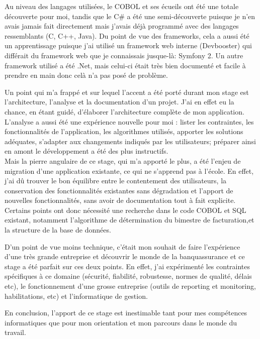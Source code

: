 \documentclass[a4paper,french,12pt]{article}
\begin{document}
		
		Au niveau des langages utilisées, le COBOL et ses écueils ont été une totale découverte pour moi, tandis que le C\# a été une semi-découverte puisque je n'en avais jamais fait directement mais 
		j'avais déjà programmé avec des langages ressemblants (C, C++, Java).
		Du point de vue des frameworks, cela a aussi été un apprentissage puisque j'ai utilisé un framework web interne (Devbooster) qui différait du framework web que je connaissais jusque-là: Symfony 2.
		Un autre framework utilisé a été .Net, mais celui-ci était très bien documenté et facile à prendre en main donc celà n'a pas posé de problème.
		
		Un point qui m'a frappé et sur lequel l'accent a été porté durant mon stage est l'architecture, l'analyse et la documentation d'un projet. J'ai en effet eu la chance, en étant guidé, d'élaborer
		l'architecture complète de mon application. L'analyse a aussi été une expérience nouvelle pour moi : lister les contraintes, les fonctionnalités de l'application, les algorithmes utilisés, apporter les solutions adéquates,
		s'adapter aux changements indiqués par les utilisateurs; préparer ainsi en amont le développement a été des plus instructifs.\\
		
		
		Mais la pierre angulaire de ce stage, qui m'a apporté le plus, a été l'enjeu de migration d'une application existante, ce qui ne s'apprend pas à l'école. En effet, j'ai dû trouver le bon équilibre
		entre le contentement des utilisateurs, la conservation des fonctionnalités existantes sans dégradation et l'apport de nouvelles fonctionnalités, sans avoir de documentation tout à fait explicite.
		Certains points ont donc nécessité une recherche dans le code COBOL et SQL existant, notamment l'algorithme de détermination du bimestre de facturation,et la structure de la base de données.
		
		
		D'un point de vue moins technique, c'était mon souhait de faire l'expérience d'une très grande entreprise et découvrir le monde de la banquassurance et ce stage a été parfait sur ces deux points.
		En effet, j'ai expérimenté les contraintes spécifiques à ce domaine (sécurité, fiabilité, robustesse, normes de qualité, délais etc), le fonctionnement d'une grosse entreprise (outils de reporting et monitoring,
		habilitations, etc) et l'informatique de gestion.
		
		En conclusion, l'apport de ce stage est inestimable tant pour mes compétences informatiques que pour mon orientation et mon parcours dans le monde du travail.
	
\end{document}
